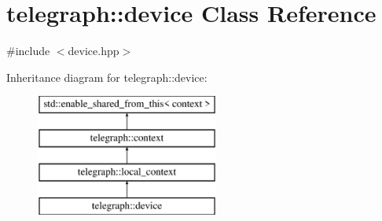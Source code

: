 \hypertarget{classtelegraph_1_1device}{}\section{telegraph\+:\+:device Class Reference}
\label{classtelegraph_1_1device}


{\ttfamily \#include $<$device.\+hpp$>$}

Inheritance diagram for telegraph\+:\+:device\+:\begin{figure}[H]
\begin{center}
\leavevmode
\includegraphics[height=4.000000cm]{classtelegraph_1_1device}
\end{center}
\end{figure}
